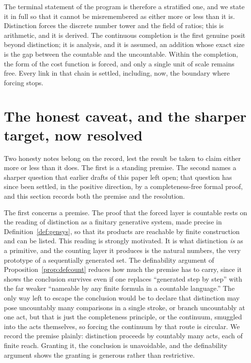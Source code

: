 \documentclass[11pt,a4paper]{article}
\theoremstyle{definition}
\theoremstyle{remark}
\begin{document}
The terminal statement of the program is therefore a stratified one, and we state
it in full so that it cannot be misremembered as either more or less than it is.
Distinction forces the discrete number tower and the field of ratios; this is
arithmetic, and it is derived. The continuous completion is the first genuine
posit beyond distinction; it is analysis, and it is assumed, an addition whose
exact size is the gap between the countable and the uncountable. Within the
completion, the form of the cost function is forced, and only a single unit of
scale remains free. Every link in that chain is settled, including, now, the
boundary where forcing stops.

\section{The honest caveat, and the sharper target, now resolved}

Two honesty notes belong on the record, lest the result be taken to claim either
more or less than it does. The first is a standing premise. The second names a
sharper question that earlier drafts of this paper left open; that question has
since been settled, in the positive direction, by a completeness-free formal
proof, and this section records both the premise and the resolution.

The first concerns a premise. The proof that the forced layer is countable rests
on the reading of distinction as a finitary generative system, made precise in
Definition~\ref{def:gensys}, so that its products are reachable by finite
construction and can be listed. This reading is strongly motivated. It is what
distinction \emph{is} as a primitive, and the counting layer it produces is the
natural numbers, the very prototype of a sequentially generated set. The
definability argument of Proposition~\ref{prop:defcount} reduces how much the
premise has to carry, since it shows the conclusion survives even if one replaces
``generated step by step'' with the far weaker ``nameable by any finite formula
in a countable language.'' The only way left to escape the conclusion would be to
declare that distinction may pose uncountably many comparisons in a single
stroke, or branch uncountably at one act, but that is just the completeness
principle, or the continuum, smuggled into the acts themselves, so forcing the
continuum by that route is circular. We record the premise plainly: distinction
proceeds by countably many acts, each of finite reach. Granting it, the
conclusion is unavoidable, and the definability argument shows the granting is
generous rather than restrictive.
\end{document}
